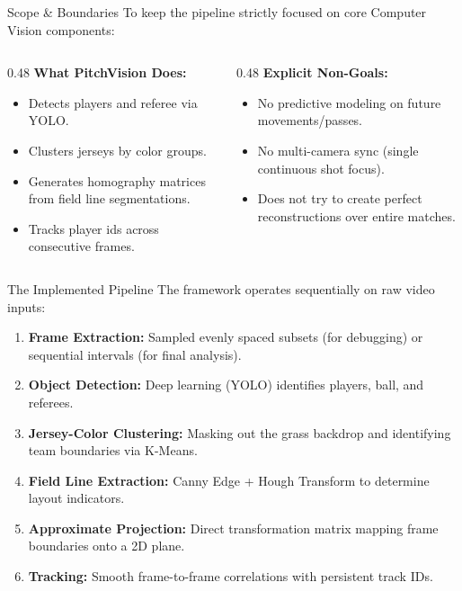 \documentclass[10pt]{beamer}
\begin{document}
\begin{frame}{Scope \& Boundaries}
    To keep the pipeline strictly focused on core Computer Vision components:
    \vspace{0.4cm}
    \begin{columns}[t]
        \begin{column}{0.48\textwidth}
            \color{blue}\textbf{What PitchVision Does:}
            \begin{itemize}
                \color{black}
                \item Detects players and referee via YOLO.
                \item Clusters jerseys by color groups.
                \item Generates homography matrices from field line segmentations.
                \item Tracks player ids across consecutive frames.
            \end{itemize}
        \end{column}
        \begin{column}{0.48\textwidth}
            \color{red}\textbf{Explicit Non-Goals:}
            \begin{itemize}
                \color{black}
                \item No predictive modeling on future movements/passes.
                \item No multi-camera sync (single continuous shot focus).
                \item Does not try to create perfect reconstructions over entire matches.
            \end{itemize}
        \end{column}
    \end{columns}
\end{frame}

\begin{frame}{The Implemented Pipeline}
    The framework operates sequentially on raw video inputs:
    \vspace{0.2cm}
    \begin{enumerate}
        \item \textbf{Frame Extraction:} Sampled evenly spaced subsets (for debugging) or sequential intervals (for final analysis).
        \item \textbf{Object Detection:} Deep learning (YOLO) identifies players, ball, and referees.
        \item \textbf{Jersey-Color Clustering:} Masking out the grass backdrop and identifying team boundaries via K-Means.
        \item \textbf{Field Line Extraction:} Canny Edge + Hough Transform to determine layout indicators.
        \item \textbf{Approximate Projection:} Direct transformation matrix mapping frame boundaries onto a 2D plane.
        \item \textbf{Tracking:} Smooth frame-to-frame correlations with persistent track IDs.
    \end{enumerate}
\end{frame}
\end{document}
